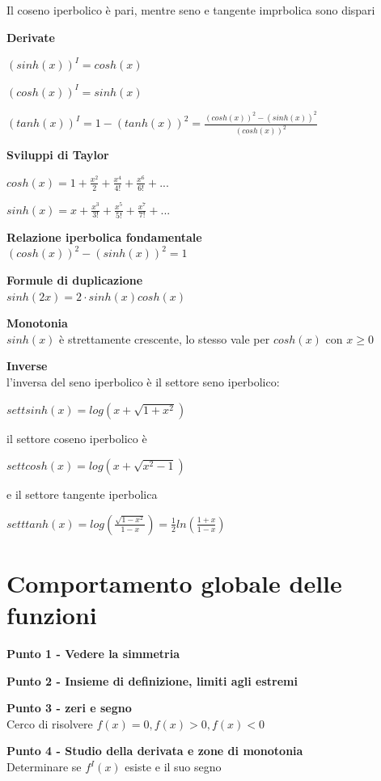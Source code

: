 \documentclass[12pt, a4paper]{article}
\begin{document}
    Il coseno iperbolico è pari, mentre seno e tangente imprbolica sono dispari

    \textbf{Derivate}

$(sinh(x))^{I}=cosh(x)$

$(cosh(x))^{I}=sinh(x)$

$(tanh(x))^{I}=1-(tanh(x))^{2}=\frac{(cosh(x))^{2}-(sinh(x))^{2}}{(cosh(x))^{2}}$

    \textbf{Sviluppi di Taylor}

$cosh(x)=1+\frac{x^{2}}{2}+\frac{x^{4}}{4!}+\frac{x^{6}}{6!}+...$

$sinh(x)=x+\frac{x^{3}}{3!}+\frac{x^{5}}{5!}+\frac{x^{7}}{7!}+...$

    \textbf{Relazione iperbolica fondamentale}\\$(cosh(x))^{2}-(sinh(x))^{2}=1$

\textbf{Formule di duplicazione}\\$sinh(2x)=2\cdot sinh(x)cosh(x)$

    \textbf{Monotonia}\\ $sinh(x)$ è strettamente crescente, lo stesso vale per $cosh(x)$ con $x\geq 0$

    \textbf{Inverse}\\l'inversa del seno iperbolico è il settore seno iperbolico:
    \begin{center}
        $settsinh(x)=log(x+\sqrt{1+x^{2}})$
    \end{center}
    il settore coseno iperbolico è
    \begin{center}
        $settcosh(x)=log(x+\sqrt{x^{2}-1})$
    \end{center}
    e il settore tangente iperbolica
    \begin{center}
        $setttanh(x)=log(\frac{\sqrt{1-x^{2}}}{1-x})=\frac{1}{2}ln(\frac{1+x}{1-x})$
    \end{center}

    \newpage
    \section{Comportamento globale delle funzioni}
    \textbf{Punto 1 - Vedere la simmetria}

    \textbf{Punto 2 - Insieme di definizione, limiti agli estremi}

    \textbf{Punto 3 - zeri e segno}\\Cerco di risolvere $f(x)=0,f(x)>0,f(x)<0$

    \textbf{Punto 4 - Studio della derivata e zone di monotonia}\\Determinare se $f^{I}(x)$ esiste e il suo segno
\end{document}
